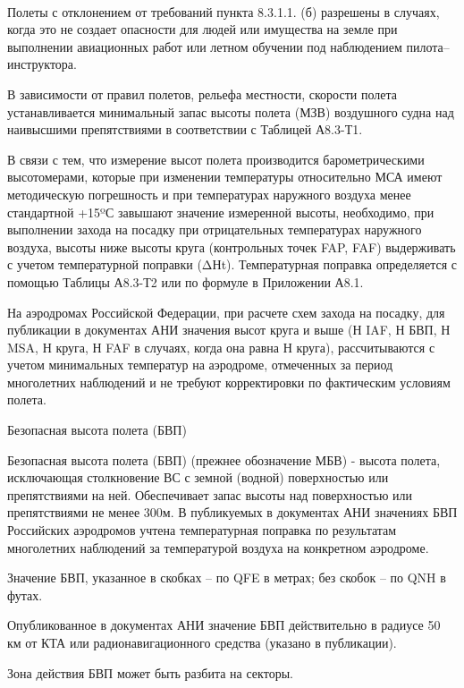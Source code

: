 \paragraph{} Полеты с отклонением от требований пункта 8.3.1.1. (б) разрешены в случаях, когда это не создает опасности для людей или имущества на земле при выполнении авиационных работ или летном обучении под наблюдением пилота–инструктора. 

В зависимости от правил полетов, рельефа местности, скорости полета устанавливается минимальный запас высоты полета (МЗВ) воздушного судна над наивысшими препятствиями в соответствии с Таблицей А8.3-Т1.

В связи с тем, что измерение высот полета производится барометрическими высотомерами, которые при изменении температуры относительно МСА имеют методическую погрешность и при температурах наружного воздуха менее стандартной +15ºС завышают значение измеренной высоты, необходимо, при выполнении захода на посадку при отрицательных температурах наружного воздуха, высоты ниже высоты круга (контрольных точек FAP, FAF) выдерживать с учетом температурной поправки (ΔНt). 
Температурная поправка определяется с помощью Таблицы А8.3-Т2 или по формуле в Приложении А8.1.

На аэродромах Российской Федерации, при расчете схем захода на посадку, для публикации в документах АНИ значения высот круга и выше (Н IAF, Н БВП, Н MSA, Н круга, Н FAF в случаях, когда она равна Н круга), рассчитываются с учетом минимальных температур на аэродроме, отмеченных за период многолетних наблюдений и не требуют корректировки по фактическим условиям полета. 

Безопасная высота полета (БВП) 

Безопасная высота полета (БВП) (прежнее обозначение МБВ) - высота полета, исключающая столкновение ВС с земной (водной) поверхностью или препятствиями на ней. Обеспечивает запас высоты над поверхностью или препятствиями не менее 300м. В публикуемых в документах АНИ значениях БВП Российских аэродромов учтена температурная поправка по результатам многолетних наблюдений за температурой воздуха на конкретном аэродроме.

Значение БВП, указанное в скобках – по QFE в метрах; без скобок – по QNH в футах. 

Опубликованное в документах АНИ значение БВП действительно в радиусе 50 км от КТА или радионавигационного средства (указано в публикации). 

Зона действия БВП может быть разбита на секторы.

